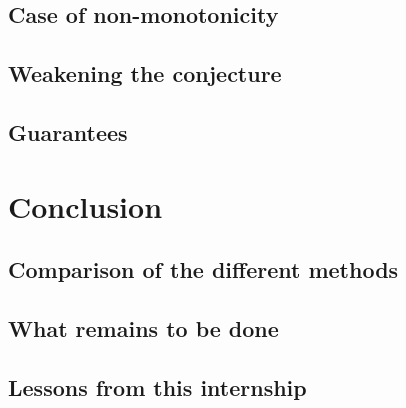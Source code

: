 \documentclass[11pt,a4paper,oldfontcommands,openany]{memoir}
\begin{document}


    \section{Case of non-monotonicity}

    \section{Weakening the conjecture}


    \section{Guarantees}

\chapter{Conclusion}

    \section{Comparison of the different methods}


    \section{What remains to be done}


    \section{Lessons from this internship}




\end{document}
